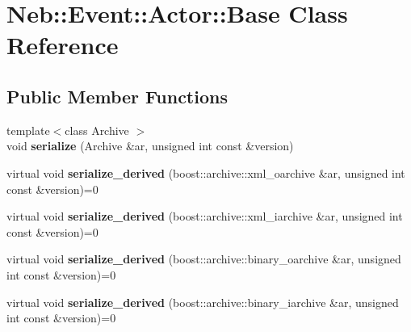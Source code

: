 \hypertarget{classNeb_1_1Event_1_1Actor_1_1Base}{\section{\-Neb\-:\-:\-Event\-:\-:\-Actor\-:\-:\-Base \-Class \-Reference}
\label{classNeb_1_1Event_1_1Actor_1_1Base}
}
\subsection*{\-Public \-Member \-Functions}
\begin{DoxyCompactItemize}
\item 
\hypertarget{classNeb_1_1Event_1_1Actor_1_1Base_a7e63345e09aa9a83dc10804d99759d6a}{{\footnotesize template$<$class Archive $>$ }\\void {\bfseries serialize} (\-Archive \&ar, unsigned int const \&version)}\label{classNeb_1_1Event_1_1Actor_1_1Base_a7e63345e09aa9a83dc10804d99759d6a}

\item 
\hypertarget{classNeb_1_1Event_1_1Actor_1_1Base_aa9cf29e608e5367af1006ceec717bbab}{virtual void {\bfseries serialize\-\_\-derived} (boost\-::archive\-::xml\-\_\-oarchive \&ar, unsigned int const \&version)=0}\label{classNeb_1_1Event_1_1Actor_1_1Base_aa9cf29e608e5367af1006ceec717bbab}

\item 
\hypertarget{classNeb_1_1Event_1_1Actor_1_1Base_ac4cc97711ed27e265ca977b89fa613e8}{virtual void {\bfseries serialize\-\_\-derived} (boost\-::archive\-::xml\-\_\-iarchive \&ar, unsigned int const \&version)=0}\label{classNeb_1_1Event_1_1Actor_1_1Base_ac4cc97711ed27e265ca977b89fa613e8}

\item 
\hypertarget{classNeb_1_1Event_1_1Actor_1_1Base_a41a75cb7ea7fc0bf463f2803ba3efa32}{virtual void {\bfseries serialize\-\_\-derived} (boost\-::archive\-::binary\-\_\-oarchive \&ar, unsigned int const \&version)=0}\label{classNeb_1_1Event_1_1Actor_1_1Base_a41a75cb7ea7fc0bf463f2803ba3efa32}

\item 
\hypertarget{classNeb_1_1Event_1_1Actor_1_1Base_a501859262708f2c72cf1a0bd20d803c7}{virtual void {\bfseries serialize\-\_\-derived} (boost\-::archive\-::binary\-\_\-iarchive \&ar, unsigned int const \&version)=0}\label{classNeb_1_1Event_1_1Actor_1_1Base_a501859262708f2c72cf1a0bd20d803c7}

\end{DoxyCompactItemize}
